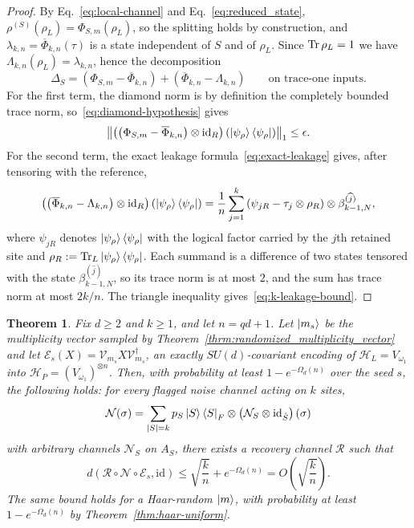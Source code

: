 \documentclass[10pt,twocolumn,superscriptaddress,aps,amsmath,amssymb,citeautoscript,floatfix,prx]{revtex4-2}
\theoremstyle{plain}
\theoremstyle{plain}
\theoremstyle{plain}
\theoremstyle{plain}
\theoremstyle{plain}
\theoremstyle{plain}
\theoremstyle{plain}
\newtheorem{smtheorem}{Theorem}[section]
\theoremstyle{definition}
\theoremstyle{plain}
\begin{document}
\begin{appendix}
\begin{proof}
    By Eq.~\eqref{eq:local-channel} and Eq.~\eqref{eq:reduced_state}, $\rho^{(S)}(\rho_L)=\Phi_{S,m}(\rho_L)$, so the splitting holds by construction, and $\lambda_{k,n}=\overline\Phi_{k,n}(\tau)$ is a state independent of $S$ and of $\rho_L$.  Since $\Tr\rho_L=1$ we have $\Lambda_{k,n}(\rho_L)=\lambda_{k,n}$, hence the decomposition
    \[
        \Delta_S
        =
        \left(\Phi_{S,m}-\overline\Phi_{k,n}\right)
        +
        \left(\overline\Phi_{k,n}-\Lambda_{k,n}\right)
        \qquad\text{on trace-one inputs.}
    \]
    For the first term, the diamond norm is by definition the completely bounded trace norm, so~\eqref{eq:diamond-hypothesis} gives
    \[
        \left\|
        \left(\left(\Phi_{S,m}-\overline\Phi_{k,n}\right)\otimes\mathrm{id}_R\right)
        \left(\ket{\psi_\rho}\bra{\psi_\rho}\right)
        \right\|_1
        \le\epsilon .
    \]
    For the second term, the exact leakage formula~\eqref{eq:exact-leakage} gives, after tensoring with the reference,
    \[
        \left(\left(\overline\Phi_{k,n}-\Lambda_{k,n}\right)\otimes\mathrm{id}_R\right)
        \left(\ket{\psi_\rho}\bra{\psi_\rho}\right)
        =
        \frac1n\sum_{j=1}^k
        \left(
            \psi_{jR}-\tau_j\otimes\rho_R
        \right)
        \otimes
        \beta_{k-1,N}^{(\widehat j)},
    \]
    where $\psi_{jR}$ denotes $\ket{\psi_\rho}\bra{\psi_\rho}$ with the logical factor carried by the $j$th retained site and $\rho_R:=\Tr_L\ket{\psi_\rho}\bra{\psi_\rho}$. 
    Each summand is a difference of two states tensored with the state $\beta_{k-1,N}^{(\widehat j)}$, so its trace norm is at most $2$, and the sum has trace norm at most $2k/n$. 
    The triangle inequality gives~\eqref{eq:k-leakage-bound}.
\end{proof}

\begin{smtheorem}\label{thrm:k_arb_scale}
    Fix $d\ge2$ and $k\ge1$, and let $n=qd+1$. 
    Let $\ket{m_s}$ be the multiplicity vector sampled by Theorem~\ref{thrm:randomized_multiplicity_vector} and let $\mathcal E_s(X)=\mathcal{V}_{m_s}X\mathcal{V}_{m_s}^\dagger$, 
    an exactly $SU(d)$-covariant encoding of $\mathcal H_L=V_{\omega_1}$ into $\mathcal H_P=(V_{\omega_1})^{\otimes n}$. 
    Then, with probability at least $1-e^{-\Omega_d(n)}$ over the seed $s$, the following holds: for every flagged noise channel acting on $k$ sites,
    \[
        \mathcal N(\sigma)
        =
        \sum_{|S|=k}
        p_S
        \ket S\bra S_F
        \otimes
        \left(\mathcal N_S\otimes\mathrm{id}_{\hat S}\right)(\sigma)
    \]
    with arbitrary channels $\mathcal N_S$ on $A_S$, there exists a recovery channel $\mathcal R$ such that
    \begin{equation}
    \label{eq:k-arb-bound}
        d(\mathcal R\circ\mathcal N\circ\mathcal E_s,\mathrm{id})
        \le
        \sqrt{\frac kn}
        +
        e^{-\Omega_d(n)}
        =
        O\!\left(\sqrt{\frac kn}\right).
    \end{equation}
    The same bound holds for a Haar-random $\ket m$, with probability at least $1-e^{-\Omega_d(n)}$ by Theorem~\ref{thm:haar-uniform}.
\end{smtheorem}


\end{appendix}
\end{document}
